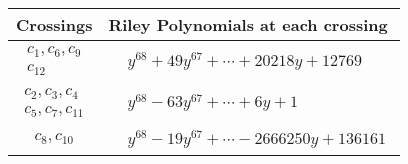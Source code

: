 \documentclass[1p]{elsarticle_modified}
\theoremstyle{definition}
\begin{document}
\begin{tabular}{m{50pt}|m{274pt}}
Crossings & \hspace{64pt}Riley Polynomials at each crossing \\
\hline $$\begin{aligned}c_{1},c_{6},c_{9}\\c_{12}\end{aligned}$$&$\begin{aligned}
&y^{68}+49 y^{67}+\cdots+20218 y+12769
\end{aligned}$\\
\hline $$\begin{aligned}c_{2},c_{3},c_{4}\\c_{5},c_{7},c_{11}\end{aligned}$$&$\begin{aligned}
&y^{68}-63 y^{67}+\cdots+6 y+1
\end{aligned}$\\
\hline $$\begin{aligned}c_{8},c_{10}\end{aligned}$$&$\begin{aligned}
&y^{68}-19 y^{67}+\cdots-2666250 y+136161
\end{aligned}$\\
\hline
\end{tabular}
\vskip 2pc
\end{document}
